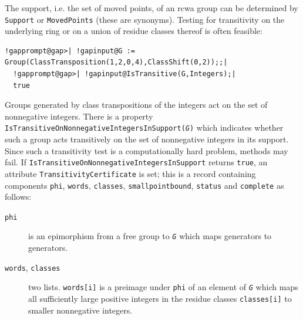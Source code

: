 \documentclass[a4paper,11pt]{report}
\begin{document}
{{    The support, i.e. the set of moved points, of an rcwa group can be determined
by \texttt{Support} or \texttt{MovedPoints} (these are synonyms). Testing for transitivity on the underlying ring or on a
union of residue classes thereof is often feasible: 
\begin{Verbatim}[commandchars=!@|,fontsize=\small,frame=single,label=Example]
  !gapprompt@gap>| !gapinput@G := Group(ClassTransposition(1,2,0,4),ClassShift(0,2));;|
  !gapprompt@gap>| !gapinput@IsTransitive(G,Integers);|
  true
\end{Verbatim}
 
     Groups generated by class transpositions of the integers act on the set of
nonnegative integers. There is a property \texttt{IsTransitiveOnNonnegativeIntegersInSupport(\mbox{\texttt{\mdseries\slshape G}})} which indicates whether such a group acts transitively on the set of
nonnegative integers in its support. Since such a transitivity test is a
computationally hard problem, methods may fail. If \texttt{IsTransitiveOnNonnegativeIntegersInSupport} returns \texttt{true}, an attribute \texttt{TransitivityCertificate} is set; this is a record containing components \texttt{phi}, \texttt{words}, \texttt{classes}, \texttt{smallpointbound}, \texttt{status} and \texttt{complete} as follows: 
\begin{description}
\item[{\texttt{phi}}]  is an epimorphism from a free group to \mbox{\texttt{\mdseries\slshape G}} which maps generators to generators. 
\item[{\texttt{words}, \texttt{classes}}]  two lists. \texttt{}\texttt{} \texttt{words[i]} is a preimage under \texttt{phi} of an element of \mbox{\texttt{\mdseries\slshape G}} which maps all sufficiently large positive integers in the residue classes \texttt{classes[i]} to smaller nonnegative integers. 

\end{description}}}
\end{document}
